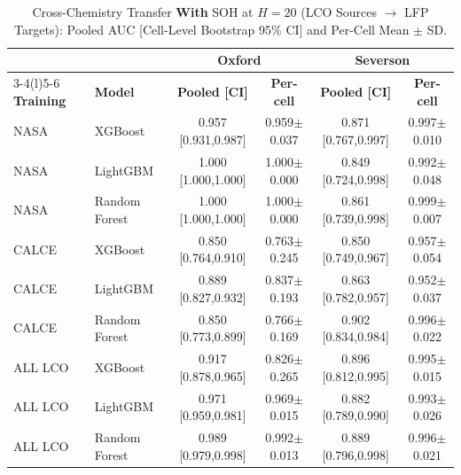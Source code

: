 \documentclass[11pt,a4paper]{article}
\begin{document}
\begin{table}[!t]
\caption{Cross-Chemistry Transfer \textbf{With} SOH at $H{=}20$ (LCO Sources $\to$ LFP Targets): Pooled AUC [Cell-Level Bootstrap 95\% CI] and Per-Cell Mean $\pm$ SD.}
\label{tab:crosswith}
\centering
\footnotesize
\begin{tabular}{llcccc}
\toprule
 & & \multicolumn{2}{c}{\textbf{Oxford}} & \multicolumn{2}{c}{\textbf{Severson}}\\
\cmidrule(lr){3-4}\cmidrule(l){5-6}
\textbf{Training} & \textbf{Model} & \textbf{Pooled [CI]} & \textbf{Per-cell} & \textbf{Pooled [CI]} & \textbf{Per-cell}\\
\midrule
NASA & XGBoost & 0.957 [0.931,0.987] & 0.959$\pm$0.037 & 0.871 [0.767,0.997] & 0.997$\pm$0.010 \\
NASA & LightGBM & 1.000 [1.000,1.000] & 1.000$\pm$0.000 & 0.849 [0.724,0.998] & 0.992$\pm$0.048 \\
NASA & Random Forest & 1.000 [1.000,1.000] & 1.000$\pm$0.000 & 0.861 [0.739,0.998] & 0.999$\pm$0.007 \\
CALCE & XGBoost & 0.850 [0.764,0.910] & 0.763$\pm$0.245 & 0.850 [0.749,0.967] & 0.957$\pm$0.054 \\
CALCE & LightGBM & 0.889 [0.827,0.932] & 0.837$\pm$0.193 & 0.863 [0.782,0.957] & 0.952$\pm$0.037 \\
CALCE & Random Forest & 0.850 [0.773,0.899] & 0.766$\pm$0.169 & 0.902 [0.834,0.984] & 0.996$\pm$0.022 \\
ALL LCO & XGBoost & 0.917 [0.878,0.965] & 0.826$\pm$0.265 & 0.896 [0.812,0.995] & 0.995$\pm$0.015 \\
ALL LCO & LightGBM & 0.971 [0.959,0.981] & 0.969$\pm$0.015 & 0.882 [0.789,0.990] & 0.993$\pm$0.026 \\
ALL LCO & Random Forest & 0.989 [0.979,0.998] & 0.992$\pm$0.013 & 0.889 [0.796,0.998] & 0.996$\pm$0.021 \\
\bottomrule
\end{tabular}
\end{table}
\end{document}
